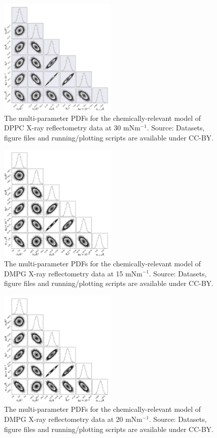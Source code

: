 \documentclass[11pt,a4paper]{article}
\begin{document}
\begin{figure}
	\centering
	\includegraphics[width=0.50\textwidth]{figures/dppc5_all_corner}
	\caption{The multi-parameter PDFs for the chemically-relevant model of DPPC X-ray reflectometry data at 30 mNm$^{-1}$. Source: Datasets, figure files and running/plotting scripts are available under CC-BY.\cite{mccluskey_2018}}
	\label{fig:dppc5}
\end{figure}
\begin{figure}[h]
	\centering
	\includegraphics[width=0.50\textwidth]{figures/dmpg2_all_corner}
	\caption{The multi-parameter PDFs for the chemically-relevant model of DMPG X-ray reflectometry data at 15 mNm$^{-1}$. Source: Datasets, figure files and running/plotting scripts are available under CC-BY.\cite{mccluskey_2018}}
	\label{fig:dmpg2}
\end{figure}
\begin{figure}[h]
	\centering
	\includegraphics[width=0.50\textwidth]{figures/dmpg3_all_corner}
	\caption{The multi-parameter PDFs for the chemically-relevant model of DMPG X-ray reflectometry data at 20 mNm$^{-1}$. Source: Datasets, figure files and running/plotting scripts are available under CC-BY.\cite{mccluskey_2018}}
	\label{fig:dmpg3}
\end{figure}
\end{document}
